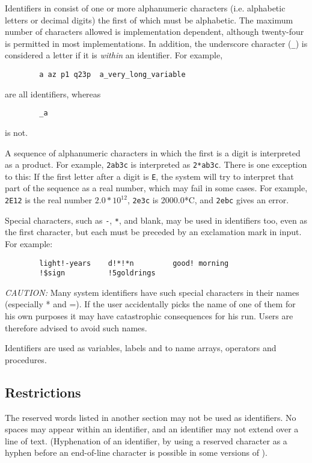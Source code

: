Identifiers in {\REDUCE} consist of one or more
alphanumeric characters (i.e. alphabetic letters or decimal
digits) the first of which must be alphabetic.  The maximum number of
characters allowed is implementation dependent, although twenty-four is
permitted in most implementations.  In addition, the underscore character
(\texttt{\_}) is considered a letter if it is \emph{within} an identifier.
For example,
\begin{verbatim}
        a az p1 q23p  a_very_long_variable
\end{verbatim}
are all identifiers, whereas
\begin{verbatim}
        _a
\end{verbatim}
is not.

A sequence of alphanumeric characters in which the first is a digit is
interpreted as a product.  For example, \texttt{2ab3c} is interpreted as
\texttt{2*ab3c}.  There is one exception to this:  If the first letter after a
digit is \texttt{E}, the system will try to interpret that part of the
sequence as a real number, which may fail in some cases.  For
example, \texttt{2E12} is the real number $2.0*10^{12}$, \texttt{2e3c} is
2000.0*C, and \texttt{2ebc} gives an error.

Special characters, such as \texttt{-}, \texttt{*}, and blank, may be
used in identifiers
too, even as the first character, but each must be preceded by an
exclamation mark in input.  For example:
\begin{verbatim}
        light!-years    d!*!*n         good! morning
        !$sign          !5goldrings
\end{verbatim}
\textit{CAUTION:} Many system identifiers have such special characters in their
names (especially * and =). If the user accidentally picks the name of one
of them for his own purposes it may have catastrophic consequences for his
{\REDUCE} run.  Users are therefore advised to avoid such names.

Identifiers are used as variables, labels and to name arrays, operators
and procedures.

\subsection*{Restrictions}

The reserved words listed in another section may not be used as
identifiers.  No spaces may appear within an identifier, and an identifier
may not extend over a line of text. (Hyphenation of an identifier, by
using a reserved character as a hyphen before an end-of-line character is
possible in some versions of {\REDUCE}).

